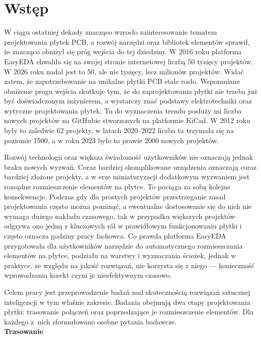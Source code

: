 
\chapter{Wstęp}

W ciągu ostatniej dekady znacząco wzrosło zainteresowanie tematem projektowania płytek PCB, a rozwój narzędzi oraz
bibliotek elementów sprawił, że znacząco obniżył się próg wejścia do tej dziedziny. W 2016 roku platforma EasyEDA
chwaliła się na swojej stronie internetowej liczbą 50 tysięcy projektów. W 2026 roku nadal jest to 50, ale nie
tysięcy, lecz milionów projektów. Widać zatem, że zapotrzebowanie na unikalne płytki PCB stale rosło. Wspomniane
obniżenie progu wejścia skutkuje tym, że do zaprojektowania płytki nie trzeba już być doświadczonym inżynierem,
a wystarczy znać podstawy elektrotechniki oraz wytyczne projektowania płytek. Tu do wyznaczenia trendu posłuży mi
liczba nowych projektów na GitHubie stworzonych na platformie KiCad. W 2012 roku były to zaledwie 62 projekty,
w latach 2020--2022 liczba ta trzymała się na poziomie 1500, a w roku 2023 było to prawie 2000 nowych projektów.

Rozwój technologii oraz większa świadomość użytkowników nie oznaczają jednak braku nowych wyzwań. Coraz bardziej
skomplikowane urządzenia oznaczają coraz bardziej złożone projekty, a w erze miniaturyzacji dodatkowym wyzwaniem
jest rozsądne rozmieszczenie elementów na płytce. To pociąga za sobą kolejne konsekwencje. Podczas gdy dla prostych
projektów przestrzeganie zasad projektowania często można pominąć, a ewentualne dostosowanie się do nich nie wymaga
dużego nakładu czasowego, tak w przypadku większych projektów odgrywa ono jedną z kluczowych ról w prawidłowym
funkcjonowaniu płytki i często oznacza godziny pracy fachowca. Co prawda platforma EasyEDA przygotowała dla
użytkowników narzędzie do automatycznego rozmieszczania elementów na płytce, podziału na warstwy i wyznaczania
ścieżek, jednak w praktyce, ze względu na jakość rozwiązań, nie korzysta się z niego --- konieczność wprowadzania
korekt czyni je nieefektywnym czasowo.

Celem pracy jest przeprowadzenie badań nad skutecznością rozwiązań sztucznej inteligencji w tym właśnie zakresie.
Badania obejmują dwa etapy projektowania płytki: trasowanie połączeń
oraz poprzedzające je rozmieszczenie elementów. Dla każdego z~nich
sformułowano osobne pytania badawcze.\\[4pt]
\textbf{Trasowanie}
\label{sec:cel-trasowanie}

